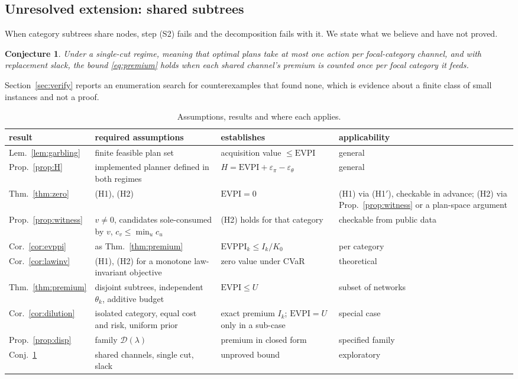 \documentclass[pdflatex,sn-mathphys-num]{sn-jnl}
\theoremstyle{thmstyleone}
\newtheorem{conjecture}[theorem]{Conjecture}
\theoremstyle{thmstyletwo}
\theoremstyle{thmstylethree}
\newcommand{\evpi}{\mathrm{EVPI}}
\newcommand{\evppi}{\mathrm{EVPPI}}
\newcommand{\ubound}{U}
\begin{document}
\subsection{Unresolved extension: shared subtrees}\label{sec:shared}

When category subtrees share nodes, step (S2) fails and the decomposition
fails with it. We state what we believe and have not proved.

\begin{conjecture}\label{conj:shared}
Under a single-cut regime, meaning that optimal plans take at most one
action per focal-category channel, and with replacement slack, the bound
\eqref{eq:premium} holds when each shared channel's premium is counted once
per focal category it feeds.
\end{conjecture}

\noindent Section~\ref{sec:verify} reports an enumeration search for
counterexamples that found none, which is evidence about a finite class of
small instances and not a proof.

\begin{table}[ht]
\caption{Assumptions, results and where each applies.}\label{tab:applic}
\small
\begin{tabular}{@{}p{2.2cm}p{3.8cm}p{3.1cm}p{2.7cm}@{}}
\toprule
result & required assumptions & establishes & applicability \\
\midrule
Lem.~\ref{lem:garbling} & finite feasible plan set &
acquisition value $\le\evpi$ & general \\
Prop.~\ref{prop:H} & implemented planner defined in both regimes &
$H=\evpi+\varepsilon_\pi-\varepsilon_\theta$ & general \\
Thm.~\ref{thm:zero} & (H1), (H2) & $\evpi=0$ & (H1) via (H1$'$), checkable in advance;
(H2) via Prop.~\ref{prop:witness} or a plan-space argument \\
Prop.~\ref{prop:witness} & $v\ne0$, candidates sole-consumed by $v$,
$c_v\le\min_u c_u$ & (H2) holds for that category & checkable from public
data \\
Cor.~\ref{cor:evppi} & as Thm.~\ref{thm:premium} &
$\evppi_k\le I_k/K_0$ & per category \\
Cor.~\ref{cor:lawinv} & (H1), (H2) for a monotone law-invariant objective &
zero value under CVaR & theoretical \\
Thm.~\ref{thm:premium} & disjoint subtrees, independent $\theta_k$,
additive budget & $\evpi\le\ubound$ & subset of networks \\
Cor.~\ref{cor:dilution} & isolated category, equal cost and risk, uniform prior &
exact premium $I_k$; $\evpi=\ubound$ only in a sub-case & special case \\
Prop.~\ref{prop:disp} & family $\mathcal D(\lambda)$ &
premium in closed form & specified family \\
Conj.~\ref{conj:shared} & shared channels, single cut, slack &
unproved bound & exploratory \\
\bottomrule
\end{tabular}
\end{table}
\end{document}
